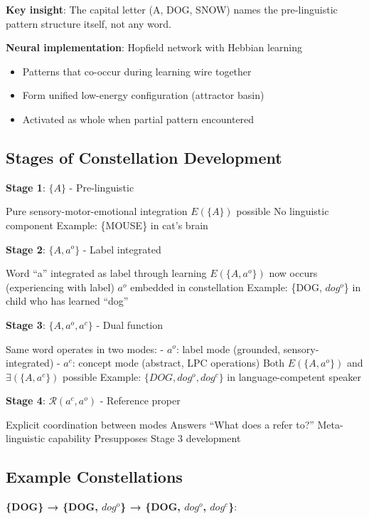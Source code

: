 \documentclass[12pt]{article}
\providecommand{\tightlist}{}   %
\begin{document}
\textbf{Key insight}: The capital letter (A, DOG, SNOW) names the pre-linguistic pattern structure itself, not any word.

\textbf{Neural implementation}: Hopfield network with Hebbian learning

\begin{itemize}
\tightlist
\item
  Patterns that co-occur during learning wire together
\item
  Form unified low-energy configuration (attractor basin)
\item
  Activated as whole when partial pattern encountered
\end{itemize}

\subsection{Stages of Constellation Development}\label{stages-of-constellation-development}

\textbf{Stage 1}: \(\{A\}\) - Pre-linguistic

Pure sensory-motor-emotional integration \(E(\{A\})\) possible No linguistic component Example: \{MOUSE\} in cat's brain

\textbf{Stage 2}: \(\{A, a^o\}\) - Label integrated

Word ``a'' integrated as label through learning \(E(\{A, a^o\})\) now occurs (experiencing with label) \(a^o\) embedded in constellation Example: \{DOG, \(dog^o\)\} in child who has learned ``dog''

\textbf{Stage 3}: \(\{A, a^o, a^c\}\) - Dual function

Same word operates in two modes: - \(a^o\): label mode (grounded, sensory-integrated) - \(a^c\): concept mode (abstract, LPC operations) Both \(E(\{A, a^o\})\) and \(\exists(\{A, a^c\})\) possible Example: \(\{DOG, dog^o, dog^c\}\) in language-competent speaker

\textbf{Stage 4}: \(\mathcal{R}(a^c, a^o)\) - Reference proper

Explicit coordination between modes Answers ``What does a refer to?'' Meta-linguistic capability Presupposes Stage 3 development

\subsection{Example Constellations}\label{example-constellations}

\textbf{\{DOG\} → \{DOG, \(dog^o\)\} → \{DOG, \(dog^o\), \(dog^c\)\}}:
\end{document}

